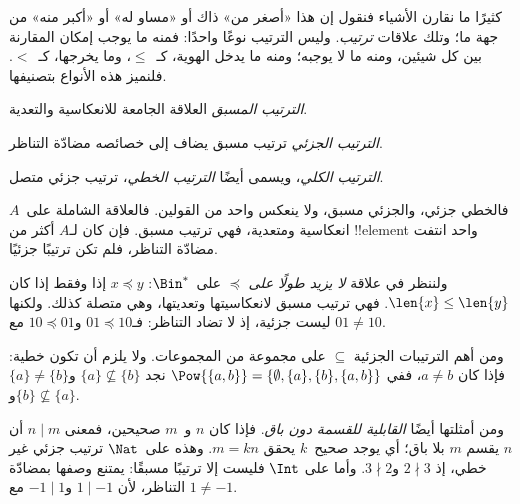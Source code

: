 \documentclass[../../../include/open-logic-section]{subfiles}
\begin{document}

\begin{explain}
كثيرًا ما نقارن الأشياء فنقول إن هذا «أصغر من» ذاك أو «مساو له»
أو «أكبر منه» من جهة ما؛ وتلك علاقات \emph{ترتيب}. وليس الترتيب
نوعًا واحدًا: فمنه ما يوجب إمكان المقارنة بين كل شيئين، ومنه ما لا
يوجبه؛ ومنه ما يدخل الهوية، كـ~$\le$، وما يخرجها، كـ~$<$.
فلنميز هذه الأنواع بتصنيفها.
\end{explain}

\begin{defn}
\emph{الترتيب المسبق} العلاقة الجامعة للانعكاسية والتعدية.
\end{defn}

\begin{defn}
\emph{الترتيب الجزئي} ترتيب مسبق يضاف إلى خصائصه مضادّة التناظر.
\end{defn}

\begin{defn}
\emph{الترتيب الكلي}، ويسمى أيضًا \emph{الترتيب الخطي}، ترتيب جزئي متصل.
\end{defn}

\begin{ex}
فالخطي جزئي، والجزئي مسبق، ولا ينعكس واحد من القولين.
فالعلاقة الشاملة على~$A$ انعكاسية ومتعدية، فهي ترتيب مسبق.
فإن كان لـ$A$ أكثر من !!{element} واحد انتفت مضادّة التناظر،
فلم تكن ترتيبًا جزئيًا.
\end{ex}

\begin{ex}
ولننظر في علاقة \emph{لا يزيد طولًا على} $\preccurlyeq$ على~$\Bin^*$:
$x \preccurlyeq y$ إذا وفقط إذا كان $\len{x} \le \len{y}$.
فهي ترتيب مسبق لانعكاسيتها وتعديتها، وهي متصلة كذلك. ولكنها ليست
جزئية، إذ لا تضاد التناظر: فـ$01 \preccurlyeq 10$ و$10 \preccurlyeq 01$
مع $01 \neq 10$.
\end{ex}

\begin{ex}
ومن أهم الترتيبات الجزئية $\subseteq$ على مجموعة من المجموعات.
ولا يلزم أن تكون خطية: فإذا كان $a \neq b$، ففي
$\Pow{\{a, b\}} = \{\emptyset, \{a\}, \{b\}, \{a,b\}\}$
نجد $\{a\} \nsubseteq \{b\}$ و$\{a\} \neq \{b\}$ و$\{b\}
\nsubseteq \{a\}$.
\end{ex}

\begin{ex}
ومن أمثلتها أيضًا \emph{القابلية للقسمة دون باق}. فإذا كان $n$ و~$m$
صحيحين، فمعنى $n \mid m$ أن $n$ يقسم $m$ بلا باق؛ أي يوجد صحيح~$k$
يحقق $m = kn$. وهذه على~$\Nat$ ترتيب جزئي غير خطي، إذ
$2 \nmid 3$ و$3 \nmid 2$. وأما على $\Int$ فليست إلا ترتيبًا مسبقًا:
يمتنع وصفها بمضادّة التناظر، لأن $1 \mid -1$ و$-1 \mid 1$ مع
$1 \neq -1$.
\end{ex}
\end{document}
